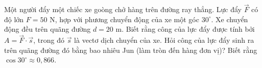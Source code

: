 \begin{bt}%
	Một người đẩy một chiếc xe goòng chở hàng trên đường ray thẳng. Lực đẩy $\overrightarrow{F}$ có độ lớn $F=50$ N, hợp với phương chuyển động của xe một góc $30^\circ$. Xe chuyển động đều trên quãng đường $d=20$ m. Biết rằng công của lực đẩy được tính bởi $A=\overrightarrow{F}\cdot\overrightarrow{s}$, trong đó $\overrightarrow{s}$ là vectơ dịch chuyển của xe. Hỏi công của lực đẩy sinh ra trên quãng đường đó bằng bao nhiêu Jun (làm tròn đến hàng đơn vị)? Biết rằng $\cos 30^\circ\approx 0{,}866$.
	
\end{bt}
